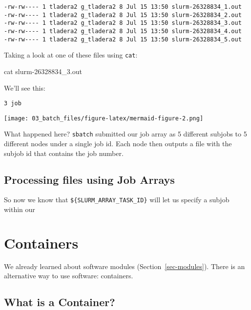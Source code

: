 \documentclass[
  letterpaper,
  DIV=11,
  numbers=noendperiod]{scrreprt}
\newenvironment{Shaded}{\begin{snugshade}}{\end{snugshade}}
\newcommand{\FunctionTok}[1]{\textcolor[rgb]{0.28,0.35,0.67}{#1}}
\newcommand{\NormalTok}[1]{\textcolor[rgb]{0.00,0.23,0.31}{#1}}
\begin{document}
\begin{verbatim}
-rw-rw---- 1 tladera2 g_tladera2 8 Jul 15 13:50 slurm-26328834_1.out
-rw-rw---- 1 tladera2 g_tladera2 8 Jul 15 13:50 slurm-26328834_2.out
-rw-rw---- 1 tladera2 g_tladera2 8 Jul 15 13:50 slurm-26328834_3.out
-rw-rw---- 1 tladera2 g_tladera2 8 Jul 15 13:50 slurm-26328834_4.out
-rw-rw---- 1 tladera2 g_tladera2 8 Jul 15 13:50 slurm-26328834_5.out
\end{verbatim}

Taking a look at one of these files using \texttt{cat}:

\begin{Shaded}
\begin{Highlighting}[]
\FunctionTok{cat}\NormalTok{ slurm{-}26328834\_3.out}
\end{Highlighting}
\end{Shaded}

We'll see this:

\begin{verbatim}
3 job
\end{verbatim}

\texttt{[image: 03\_batch\_files/figure-latex/mermaid-figure-2.png]}

What happened here? \texttt{sbatch} submitted our job array as 5
different subjobs to 5 different nodes under a single job id. Each node
then outputs a file with the subjob id that contains the job number.

\subsection{Processing files using Job
Arrays}\label{processing-files-using-job-arrays}

So now we know that \texttt{\$\{SLURM\_ARRAY\_TASK\_ID\}} will let us
specify a subjob within our

\section{Containers}\label{containers}

We already learned about software modules (Section~\ref{sec-modules}).
There is an alternative way to use software: containers.

\subsection{What is a Container?}\label{what-is-a-container}
\end{document}
